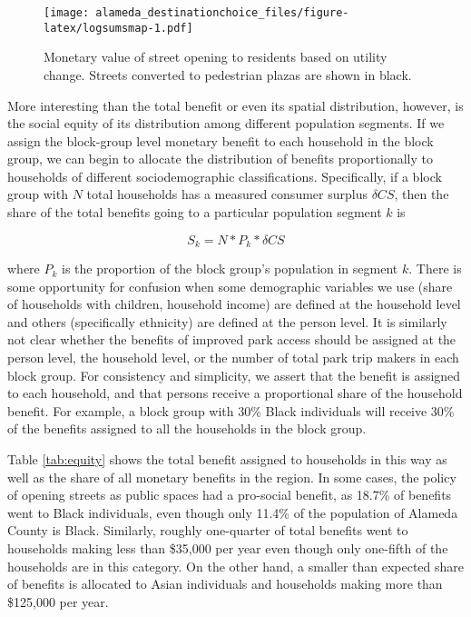 \documentclass[3p, authoryear, review]{elsarticle} %
\begin{document}
\begin{figure}
\centering
\texttt{[image: alameda\_destinationchoice\_files/figure-latex/logsumsmap-1.pdf]}
\caption{\label{fig:logsumsmap}Monetary value of street opening to residents based on utility change. Streets converted to pedestrian plazas are shown in black.}
\end{figure}

More interesting than the total benefit or even its spatial distribution,
however, is the social equity of its distribution among different population
segments. If we assign the block-group level monetary benefit to each household
in the block group, we can begin to allocate the distribution of benefits
proportionally to households of different sociodemographic classifications.
Specifically, if a block group with \(N\) total households has a measured consumer
surplus \(\delta CS\), then the share of the total benefits going to a particular
population segment \(k\) is

\begin{equation}
  S_k = N * P_k * \delta CS
  \label{eq:cs-alloc}
\end{equation}

where \(P_k\) is the proportion of the block group's population in segment \(k\).
There is some opportunity for confusion when some demographic variables we use
(share of households with children, household income) are defined at the
household level and others (specifically ethnicity) are defined at the person level. It is
similarly not clear whether the benefits of improved park access should be
assigned at the person level, the household level, or the number of total park
trip makers in each block group. For consistency and simplicity, we assert that
the benefit is assigned to each household, and that persons receive a
proportional share of the household benefit. For example, a block group with 30\%
Black individuals will receive 30\% of the benefits assigned to all the
households in the block group.

Table \ref{tab:equity} shows the total benefit assigned to households in this
way as well as the share of all monetary benefits in the region. In some cases,
the policy of opening streets as public spaces had a pro-social benefit, as
18.7\% of benefits went to Black individuals, even though only 11.4\% of the
population of Alameda County is Black. Similarly, roughly one-quarter of total
benefits went to households making less than \$35,000 per year even though only
one-fifth of the households are in this category. On the other hand, a smaller
than expected share of benefits is allocated to Asian individuals and households
making more than \$125,000 per year.
\end{document}
